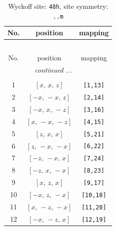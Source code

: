 \documentclass[fleqn,8pt]{jsarticle}
\begin{document}
\begin{longtable}{ccc}
\caption{Wyckoff site: {\tt 48h}, site symmetry: {\tt ..m}}
 \\
 \hline \hline
No. & position & mapping \\ \hline \endfirsthead

\multicolumn{2}{l}{\tablename\ \thetable{}} \\
 \hline \hline
No. & position & mapping \\ \hline \endhead

 \hline \hline
\multicolumn{2}{r}{\footnotesize\it continued ...} \\ \endfoot

 \hline \hline
\multicolumn{2}{r}{} \\ \endlastfoot

1 & $\left[ x,\, x,\, z \right]$ & {\tt [1,13]} \\ \hline
2 & $\left[ - x,\, - x,\, z \right]$ & {\tt [2,14]} \\ \hline
3 & $\left[ - x,\, x,\, - z \right]$ & {\tt [3,16]} \\ \hline
4 & $\left[ x,\, - x,\, - z \right]$ & {\tt [4,15]} \\ \hline
5 & $\left[ z,\, x,\, x \right]$ & {\tt [5,21]} \\ \hline
6 & $\left[ z,\, - x,\, - x \right]$ & {\tt [6,22]} \\ \hline
7 & $\left[ - z,\, - x,\, x \right]$ & {\tt [7,24]} \\ \hline
8 & $\left[ - z,\, x,\, - x \right]$ & {\tt [8,23]} \\ \hline
9 & $\left[ x,\, z,\, x \right]$ & {\tt [9,17]} \\ \hline
10 & $\left[ - x,\, z,\, - x \right]$ & {\tt [10,18]} \\ \hline
11 & $\left[ x,\, - z,\, - x \right]$ & {\tt [11,20]} \\ \hline
12 & $\left[ - x,\, - z,\, x \right]$ & {\tt [12,19]} \\
\end{longtable}
\renewcommand{\arraystretch}{1.2}
\end{document}
